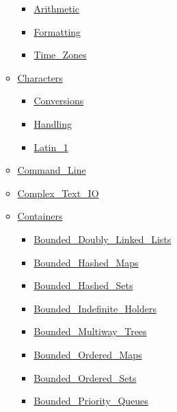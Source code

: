 \begin{multicols*}{\columnnr}
\begin{scriptsize}
\begin{itemize}[leftmargin=0mm]
\begin{itemize}[leftmargin=5mm]
	\begin{itemize}[leftmargin=5mm]
	\item[] \href{http://www.ada-auth.org/standards/22rm/html/RM-9-6-1.html}{Arithmetic}
	\item[] \href{http://www.ada-auth.org/standards/22rm/html/RM-9-6-1.html}{Formatting}
	\item[] \href{http://www.ada-auth.org/standards/22rm/html/RM-9-6-1.html}{Time\_Zones}
	\end{itemize}
  \item[] \href{http://www.ada-auth.org/standards/22rm/html/RM-A-3-1.html}{Characters}
	\begin{itemize}[leftmargin=5mm]
	\item[] \href{http://www.ada-auth.org/standards/22rm/html/RM-A-3-4.html}{Conversions}
	\item[] \href{http://www.ada-auth.org/standards/22rm/html/RM-A-3-2.html}{Handling}
	\item[] \href{http://www.ada-auth.org/standards/22rm/html/RM-A-3-3.html}{Latin\_1}
	\end{itemize}
  \item[] \href{http://www.ada-auth.org/standards/22rm/html/RM-A-15.html}{Command\_Line}
  \item[] \href{http://www.ada-auth.org/standards/22rm/html/RM-G-1-3.html}{Complex\_Text\_IO}
  \item[] \href{http://www.ada-auth.org/standards/22rm/html/RM-A-18-1.html}{Containers}
	\begin{itemize}[leftmargin=5mm]
	\item[] \href{http://www.ada-auth.org/standards/22rm/html/RM-A-18-20.html}{Bounded\_Doubly\_Linked\_Lists}
	\item[] \href{http://www.ada-auth.org/standards/22rm/html/RM-A-18-21.html}{Bounded\_Hashed\_Maps}
	\item[] \href{http://www.ada-auth.org/standards/22rm/html/RM-A-18-23.html}{Bounded\_Hashed\_Sets}
	\item[] \href{http://www.ada-auth.org/standards/22rm/html/RM-A-18-32.html}{Bounded\_Indefinite\_Holders}
	\item[] \href{http://www.ada-auth.org/standards/22rm/html/RM-A-18-25.html}{Bounded\_Multiway\_Trees}
	\item[] \href{http://www.ada-auth.org/standards/22rm/html/RM-A-18-22.html}{Bounded\_Ordered\_Maps}
	\item[] \href{http://www.ada-auth.org/standards/22rm/html/RM-A-18-24.html}{Bounded\_Ordered\_Sets}
	\item[] \href{http://www.ada-auth.org/standards/22rm/html/RM-A-18-31.html}{Bounded\_Priority\_Queues}

\end{itemize}
\end{itemize}
\end{itemize}
\end{scriptsize}
\end{multicols*}
